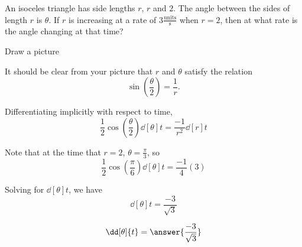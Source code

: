 \documentclass{ximera}
\author{Steven Gubkin}
\begin{document}
\begin{exercise}



An isoceles triangle has side lengths $r$, $r$ and $2$.  The angle
between the sides of length $r$ is $\theta$.  If $r$ is increasing at
a rate of $3 \frac{\textrm{units}}{\textrm{s}}$ when $r = 2$, then at
what rate is the angle changing at that time?

\begin{hint}
  Draw a picture
\end{hint}

\begin{hint}
  It should be clear from your picture that $r$ and $\theta$ satisfy the relation 
  \[
  \sin(\frac{\theta}{2}) = \frac{1}{r}.
  \]
\end{hint}

\begin{hint}
  Differentiating implicitly with respect to time, 
  \[
  \frac{1}{2}\cos(\frac{\theta}{2}) \dd[\theta]{t} = \frac{-1}{r^2}
  \dd[r]{t}
  \]
\end{hint}

\begin{hint}
  Note that at the time that $r = 2$, $\theta = \frac{\pi}{3}$, so
  \[
  \frac{1}{2} \cos(\frac{\pi}{6}) \dd[\theta]{t} = \frac{-1}{4} (3)
  \]
\end{hint}

\begin{hint}
  Solving for $\dd[\theta]{t}$, we have
  \[
  \dd[\theta]{t} = \frac{-3}{\sqrt{3}}
  \]
\end{hint}

\begin{prompt}
  \[
  \dd[\theta]{t} = \answer{\frac{-3}{\sqrt{3}}}
  \]
\end{prompt}
\end{exercise}
\end{document}
